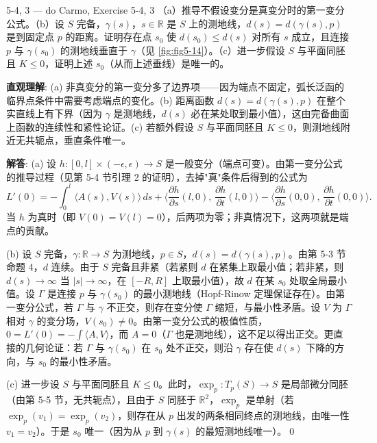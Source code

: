\begin{exercise}{5-4, 3 — do Carmo, Exercise 5-4, 3}
（a）推导不假设变分是真变分时的第一变分公式。（b）设 $S$ 完备，$\gamma(s)$，$s\in\mathbb{R}$ 是 $S$ 上的测地线，$d(s) = d(\gamma(s),p)$ 是到固定点 $p$ 的距离。证明存在点 $s_0$ 使 $d(s_0) \leq d(s)$ 对所有 $s$ 成立，且连接 $p$ 与 $\gamma(s_0)$ 的测地线垂直于 $\gamma$（见 \cref{fig:fig5-14}）。（c）进一步假设 $S$ 与平面同胚且 $K \leq 0$，证明上述 $s_0$（从而上述垂线）是唯一的。
\end{exercise}
\begin{solution}
\textbf{直观理解}: (a) 非真变分的第一变分多了边界项——因为端点不固定，弧长泛函的临界点条件中需要考虑端点的变化。(b) 距离函数 $d(s) = d(\gamma(s),p)$ 在整个实直线上有下界（因为 $\gamma$ 是测地线，$d(s)$ 必在某处取到最小值），这由完备曲面上函数的连续性和紧性论证。(c) 若额外假设 $S$ 与平面同胚且 $K \leq 0$，则测地线附近无共轭点，垂直条件唯一。

\textbf{解答}: (a) 设 $h: [0,l]\times(-\epsilon,\epsilon)\to S$ 是一般变分（端点可变）。由第一变分公式的推导过程（见第 5-4 节引理 2 的证明），去掉"真"条件后得到的公式为
\[
L'(0) = -\int_0^l \langle A(s), V(s)\rangle\,ds + \langle\frac{\partial h}{\partial s}(l,0),\, \frac{\partial h}{\partial t}(l,0)\rangle - \langle\frac{\partial h}{\partial s}(0,0),\, \frac{\partial h}{\partial t}(0,0)\rangle.
\]
当 $h$ 为真时（即 $V(0)=V(l)=0$），后两项为零；非真情况下，这两项就是端点的贡献。

(b) 设 $S$ 完备，$\gamma: \mathbb{R}\to S$ 为测地线，$p \in S$，$d(s) = d(\gamma(s),p)$。由第 5-3 节命题 4，$d$ 连续。由于 $S$ 完备且非紧（若紧则 $d$ 在紧集上取最小值；若非紧，则 $d(s) \to \infty$ 当 $|s|\to\infty$，在 $[-R,R]$ 上取最小值），故 $d$ 在某 $s_0$ 处取全局最小值。设 $\Gamma$ 是连接 $p$ 与 $\gamma(s_0)$ 的最小测地线（Hopf-Rinow 定理保证存在）。由第一变分公式，若 $\Gamma$ 与 $\gamma$ 不正交，则存在变分使 $\Gamma$ 缩短，与最小性矛盾。设 $V$ 为 $\Gamma$ 相对 $\gamma$ 的变分场，$V(s_0)\neq 0$。由第一变分公式的极值性质，$0 = L'(0) = -\int \langle A,V\rangle$，而 $A=0$（$\Gamma$ 也是测地线），这不足以得出正交。更直接的几何论证：若 $\Gamma$ 与 $\gamma(s_0)$ 在 $s_0$ 处不正交，则沿 $\gamma$ 存在使 $d(s)$ 下降的方向，与 $s_0$ 的最小性矛盾。

(c) 进一步设 $S$ 与平面同胚且 $K \leq 0$。此时，$\exp_p: T_p(S)\to S$ 是局部微分同胚（由第 5-5 节，无共轭点），且由于 $S$ 同胚于 $\mathbb{R}^2$，$\exp_p$ 是单射（若 $\exp_p(v_1) = \exp_p(v_2)$，则存在从 $p$ 出发的两条相同终点的测地线，由唯一性 $v_1=v_2$）。于是 $s_0$ 唯一（因为从 $p$ 到 $\gamma(s)$ 的最短测地线唯一）。\qed
\end{solution}

